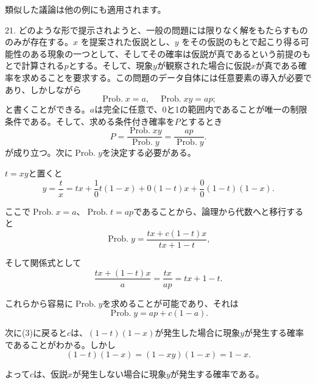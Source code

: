 \documentclass[a4paper,11pt,openany]{ltjsbook}
\begin{document}
類似した議論は他の例にも適用されます。

21. どのような形で提示されようと、一般の問題には限りなく解をもたらすもののみが存在する。$x$ を提案された仮説とし、$y$ をその仮説のもとで起こり得る可能性のある現象の一つとして、そしてその確率は仮説が真であるという前提のもとで計算される$p$とする。そして、現象$y$が観察された場合に仮説$x$が真である確率を求めることを要求する。この問題のデータ自体には任意要素の導入が必要であり、しかしながら
\begin{equation}\tag{1}
\operatorname{Prob. } x = a, \quad \operatorname{Prob. } xy = ap;
\end{equation}
と書くことができる。$a$は完全に任意で、0と1の範囲内であることが唯一の制限条件である。そして、求める条件付き確率を$P$とするとき
\begin{equation}\tag{2}
P=\frac{\operatorname{Prob. } xy}{\operatorname{Prob. } y} =\frac{ap}{\operatorname{Prob. } y}.
\end{equation}
が成り立つ。次に$\operatorname{Prob. } y$を決定する必要がある。


$t = xy$と置くと
\begin{equation}\tag{3}
y = \frac{t}{x}=tx + \frac{1}{0}t(1-x)+0(1-t)x+\frac{0}{0}(1-t)(1-x).
\end{equation}

ここで$\operatorname{Prob. } x = a$、$\operatorname{Prob. } t = ap$であることから、論理から代数へと移行すると
\begin{equation*}
\operatorname{Prob. } y = \frac{tx + c(1-t)x}{tx+1-t},
\end{equation*}

そして関係式として
\begin{equation*}
\frac{tx + (1-t)x}{a}=\frac{tx}{ap}=tx+1-t.
\end{equation*}

これらから容易に$\operatorname{Prob. } y$を求めることが可能であり、それは
\begin{equation}\tag{4}
\operatorname{Prob. } y = ap + c (1-a).
\end{equation}

次に(3)に戻ると$c$は、$(1-t)(1-x)$が発生した場合に現象$y$が発生する確率であることがわかる。しかし
\begin{equation*}
(1-t)(1-x)=(1-xy)(1-x)=1-x.
\end{equation*}

よって$c$は、仮説$x$が発生しない場合に現象$y$が発生する確率である。
\end{document}
